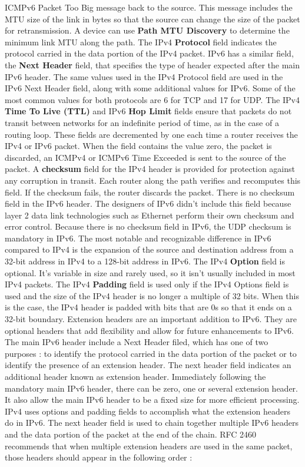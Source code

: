 \documentclass[11pt]{article}
\begin{document}
ICMPv6 Packet Too Big message back to the source. This message includes the MTU size of the link in bytes so that the source can change the size of the packet for retransmission. A device can use \textbf{Path MTU Discovery} to determine the minimum link MTU along the path. The IPv4 \textbf{Protocol} field indicates the protocol carried in the data portion of the IPv4 packet. IPv6 has a similar field, the \textbf{Next Header} field, that specifies the type of header expected after the main IPv6 header. The same values used in the IPv4 Protocol field are used in the IPv6 Next Header field, along with some additional values for IPv6. Some of the most common values for both protocols are 6 for TCP and 17 for UDP. The IPv4 \textbf{Time To Live (TTL)} and IPv6 \textbf{Hop Limit} fields ensure that packets do not transit between networks for an indefinite period of time, as in the case of a routing loop. These fields are decremented by one each time a router receives the IPv4 or IPv6 packet. When the field contains the value zero, the packet is discarded, an ICMPv4 or ICMPv6 Time Exceeded is sent to the source of the packet. A \textbf{checksum} field for the IPv4 header is provided for protection against any corruption in transit. Each router along the path verifies and recomputes this field. If the checksum fails, the router discards the packet. There is no checksum field in the IPv6 header. The designers of IPv6 didn't include this field because layer 2 data link technologies such as Ethernet perform their own checksum and error control. Because there is no checksum field in IPv6, the UDP checksum is mandatory in IPv6. The most notable and recognizable difference in IPv6 compared to IPv4 is the expansion of the source and destination address from a 32-bit address in IPv4 to a 128-bit address in IPv6. The IPv4 \textbf{Option} field is optional. It's variable in size and rarely used, so it isn't usually included in most IPv4 packets. The IPv4 \textbf{Padding} field is used only if the IPv4 Options field is used and the size of the IPv4 header is no longer a multiple of 32 bits. When this is the case, the IPv4 header is padded with bits that are 0s so that it ends on a 32-bit boundary. Extension headers are an important addition to IPv6. They are optional headers that add flexibility and allow for future enhancements to IPv6. The main IPv6 header include a Next Header filed, which has one of two purposes : to identify the protocol carried in the data portion of the packet or to identify the presence of an extension header. The next header field indicates an additional header known as extension header. Immediately following the mandatory main IPv6 header, there can be zero, one or several extension header. It also allow the main IPv6 header to be a fixed size for more efficient processing. IPv4 uses options and padding fields to accomplish what the extension headers do in IPv6. The next header field is used to chain together multiple IPv6 headers and the data portion of the packet at the end of the chain. RFC 2460 recommends that when multiple extension headers are used in the same packet, those headers should appear in the following order : 
\end{document}
